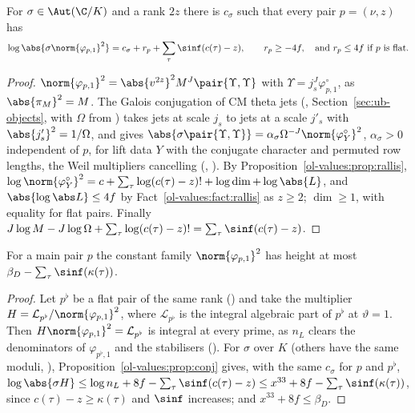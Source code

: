 \begin{proposition}
\label{ol-values:prop:conj}
For $\sigma\in\Aut(\C/K)$ and a rank $2z$ there is $c_\sigma$ such that every pair $p=(\nu,z)$ has
\[
\log\abs{\sigma\norm{\varphi_{p,1}}^2}=c_\sigma+r_p+\sum_\tau\sinf(c(\tau)-z),\qquad
r_p\ge-4f,\quad\text{and } r_p\le4f\text{ if $p$ is flat.}
\]
\end{proposition}

\begin{proof}
$\norm{\varphi_{p,1}}^2=\abs{v^{2z}}^2M^J\pair{\Upsilon,\Upsilon}$ with $\Upsilon=j_s^J\varphi^\circ_{p,1}$, as
$\abs{\pi_M}^2=M$. The Galois conjugation of CM theta jets
(, Section~\ref{sec:ub-objects}, with $\Omega$ from
) takes jets at scale
$j_s$ to jets at a scale $j'_s$ with $\abs{j'_s}^2=1/\Omega$, and gives
$\abs{\sigma\pair{\Upsilon,\Upsilon}}=\alpha_\sigma\Omega^{-J}\norm{\varphi^\circ_Y}^2$, $\alpha_\sigma>0$ independent of
$p$, for lift data $Y$ with the
conjugate character and permuted row lengths, the Weil multipliers cancelling
(,
). By Proposition~\ref{ol-values:prop:rallis},
$\log\norm{\varphi^\circ_Y}^2=c+\sum_\tau\log(c(\tau)-z)!+\log\dim+\log\abs{L}$, and
$\abs{\log\abs L}\le4f$ by Fact~\ref{ol-values:fact:rallis} as $z\ge2$; $\dim\ge1$, with equality
for flat pairs. Finally $J\log M-J\log\Omega+\sum_\tau\log(c(\tau)-z)!=\sum_\tau\sinf(c(\tau)-z)$.
\end{proof}

\begin{proposition}\label{ol-values:prop:untwisted}
For a main pair $p$ the constant family $\norm{\varphi_{p,1}}^2$ has height at most
$\beta_D-\sum_\tau\sinf(\kappa(\tau))$.
\end{proposition}

\begin{proof}
Let $p^\flat$ be a flat pair of the same rank () and take the
multiplier $H=\mathcal L_{p^\flat}/\norm{\varphi_{p,1}}^2$, where $\mathcal L_{p^\flat}$ is the integral algebraic
part of $p^\flat$ at $\vartheta=1$. Then $H\norm{\varphi_{p,1}}^2=\mathcal L_{p^\flat}$ is integral at every
prime, as $n_L$ clears the denominators of $\varphi_{p^\flat,1}$ and the stabilisers (). For $\sigma$ over
$K$ (others have the same moduli, ),
Proposition~\ref{ol-values:prop:conj} gives, with the same $c_\sigma$ for $p$ and $p^\flat$,
$\log\abs{\sigma H}\le\log n_L+8f-\sum_\tau\sinf(c(\tau)-z)\le x^{33}+8f-\sum_\tau\sinf(\kappa(\tau))$,
since $c(\tau)-z\ge\kappa(\tau)$ and $\sinf$ increases; and $x^{33}+8f\le\beta_D$.
\end{proof}

